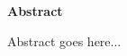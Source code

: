 \thispagestyle{plain}
\begin{center}
	\textbf{\Large Abstract}
\end{center}

		Abstract goes here...
	



	
\newpage
\thispagestyle{empty}
\cleardoublepage
